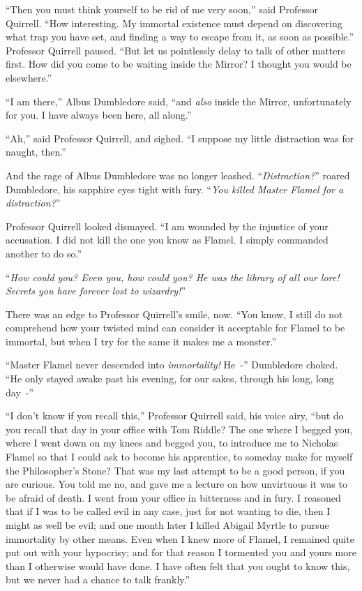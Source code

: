 ``Then you must think yourself to be rid of me very soon,'' said Professor Quirrell. ``How interesting. My immortal existence must depend on discovering what trap you have set, and finding a way to escape from it, as soon as possible.'' Professor Quirrell paused. ``But let us pointlessly delay to talk of other matters first. How did you come to be waiting inside the Mirror? I thought you would be elsewhere.''

``I am there,'' Albus Dumbledore said, ``and \emph{also} inside the Mirror, unfortunately for you. I have always been here, all along.''

``Ah,'' said Professor Quirrell, and sighed. ``I suppose my little distraction was for naught, then.''

And the rage of Albus Dumbledore was no longer leashed. ``\emph{Distraction?}'' roared Dumbledore, his sapphire eyes tight with fury. ``\emph{You killed Master Flamel for a distraction?}''

Professor Quirrell looked dismayed. ``I am wounded by the injustice of your accusation. I did not kill the one you know as Flamel. I simply commanded another to do so.''

``\emph{How could you? Even you, how could you? He was the library of all our lore! Secrets you have forever lost to wizardry!}''

There was an edge to Professor Quirrell's smile, now. ``You know, I still do not comprehend how your twisted mind can consider it acceptable for Flamel to be immortal, but when I try for the same it makes me a monster.''

``Master Flamel never descended into \emph{immortality!} He~-'' Dumbledore choked. ``He only stayed awake past his evening, for our sakes, through his long, long day~-''

``I don't know if you recall this,'' Professor Quirrell said, his voice airy, ``but do you recall that day in your office with Tom Riddle? The one where I begged you, where I went down on my knees and begged you, to introduce me to Nicholas Flamel so that I could ask to become his apprentice, to someday make for myself the Philosopher's Stone? That was my last attempt to be a good person, if you are curious. You told me no, and gave me a lecture on how unvirtuous it was to be afraid of death. I went from your office in bitterness and in fury. I reasoned that if I was to be called evil in any case, just for not wanting to die, then I might as well be evil; and one month later I killed Abigail Myrtle to pursue immortality by other means. Even when I knew more of Flamel, I remained quite put out with your hypocrisy; and for that reason I tormented you and yours more than I otherwise would have done. I have often felt that you ought to know this, but we never had a chance to talk frankly.''

